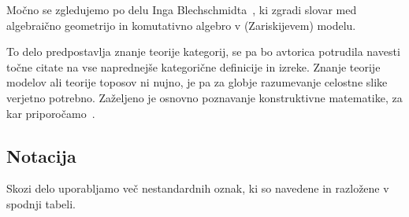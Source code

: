 

Močno se zgledujemo po delu Inga
Blechschmidta~\cite{Blechschmidt17,Blechschmidt22}, ki zgradi slovar med
algebraično geometrijo in komutativno algebro v (Zariskijevem) modelu.

To delo predpostavlja znanje teorije kategorij, se pa bo avtorica potrudila
navesti točne citate na vse naprednejše kategorične definicije in izreke. Znanje
teorije modelov ali teorije toposov ni nujno, je pa za globje razumevanje
celostne slike verjetno potrebno. Zaželjeno je osnovno poznavanje konstruktivne
matematike, za kar priporočamo~\cite{Bauer16, Bishop85}.

\subsection{Notacija}

Skozi delo uporabljamo več nestandardnih oznak, ki so navedene in razložene v
spodnji tabeli.

